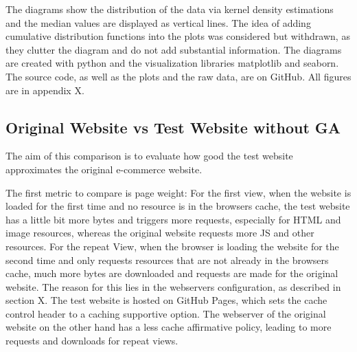 



The diagrams show the distribution of the data via kernel density estimations and the median values are displayed as vertical lines.
The idea of adding cumulative distribution functions into the plots was considered but withdrawn, as they clutter the diagram and do not add substantial information.
The diagrams are created with python and the visualization libraries matplotlib and seaborn.
The source code, as well as the plots and the raw data, are on GitHub.
All figures are in appendix X.





\subsection{Original Website vs Test Website without GA}

The aim of this comparison is to evaluate how good the test website approximates the original e-commerce website.


The first metric to compare is page weight:
For the first view, when the website is loaded for the first time and no resource is in the browsers cache, the test website has a little bit more bytes and triggers more requests, especially for HTML and image resources, whereas the original website requests more JS and other resources.
For the repeat View, when the browser is loading the website for the second time and only requests resources that are not already in the browsers cache, much more bytes are downloaded and requests are made for the original website.
The reason for this lies in the webservers configuration, as described in section X.
The test website is hosted on GitHub Pages, which sets the cache control header to a caching supportive option.
The webserver of the original website on the other hand has a less cache affirmative policy, leading to more requests and downloads for repeat views.



